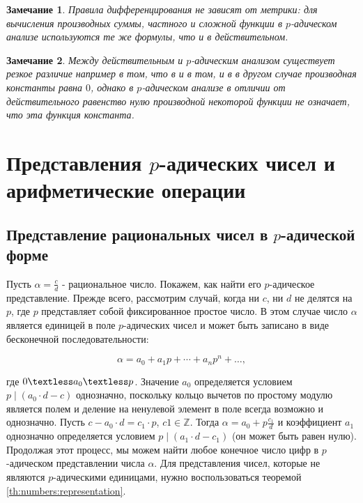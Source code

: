 \documentclass[master, och, diploma, times]{sty/SCWorks}
\theoremstyle{plain}
\newtheorem{note}{Замечание}[section]
\theoremstyle{definition}
\numberwithin{equation}{section}
\begin{document}
\begin{note}
Правила дифференцирования не зависят от метрики: для вычисления производных суммы, частного и сложной функции в $p$-адическом анализе используются те же формулы, что и в действительном.
\end{note}

\begin{note}
Между действительным и $p$-адическим анализом существует резкое различие например в том, что в и в том, и в в другом случае производная константы равна $0$, однако в $p$-адическом анализе в отличии от действительного равенство нулю производной некоторой функции не означает, что эта функция константа.\cite{bib:analysis:alain}
\end{note}

\section{Представления $p$-адических чисел и арифметические операции}

\subsection{Представление рациональных чисел в $p$-адической форме}
Пусть $\alpha=\frac{c}{d}$ - рациональное число. Покажем, как найти его $p$-адическое представление. Прежде всего, рассмотрим случай, когда ни $c$, ни $d$ не делятся на $p$, где $p$ представляет собой фиксированное простое число. В этом случае число $\alpha$ является единицей в поле $p$-адических чисел и может быть записано в виде бесконечной последовательности: 

\begin{equation}\label{formula:padic:def}
\alpha=a_0+a_1p+\cdots+a_np^n+\dots,	
\end{equation}

\noindent где $0 \textless a_0 \textless p$. Значение $a_0$ определяется условием $p \mid (a_0 \cdot d-c)$ однозначно, поскольку кольцо вычетов по простому модулю является полем и деление на ненулевой элемент в поле всегда возможно и однозначно. Пусть $c-a_0 \cdot d=c_1 \cdot p$, $c1 \in \mathbb{Z}$. Тогда $\alpha=a_0+p\frac{c_1}{d}$ и коэффициент $a_1$ однозначно определяется условием $p \mid (a_1 \cdot d-c_1)$ (он может быть равен нулю). Продолжая этот процесс, мы можем найти любое конечное число цифр в $p$-адическом представлении числа $\alpha$. Для представления чисел, которые не являются $p$-адическими единицами, нужно воспользоваться теоремой \ref{th:numbers:representation}.
\end{document}
